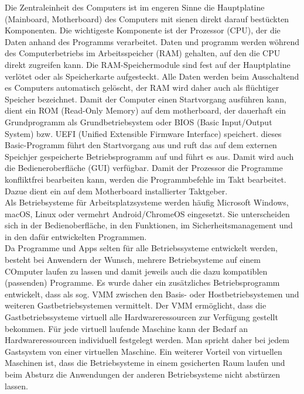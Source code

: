 \documentclass[a4paper, 12pt]{report}
\begin{document}
\begin{multicols}{2}
Die Zentraleinheit des Computers ist im engeren Sinne die Hauptplatine
(Mainboard, Motherboard) des Computers mit sienen direkt darauf bestückten
Komponenten. Die wichtigeste Komponente ist der Prozessor (CPU), der die Daten
anhand des Programms verarbeitet. Daten und programm werden wöhrend des
Computerbetriebs im Arbeitsspeicher (RAM) gehalten, auf den die CPU direkt
zugreifen kann. %
Die RAM-Speichermodule sind fest auf der Hauptplatine verlötet oder als
Speicherkarte aufgesteckt. Alle Daten werden beim Ausschaltend es Computers
automatisch gelöscht, der RAM wird daher auch als flüchtiger Speicher
bezeichnet. %
Damit der Computer einen Startvorgang ausführen kann, dient ein ROM (Read-Only
Memory) auf dem motherboard, der dauerhaft ein Grundprogramm als
Grundbetriebsystem oder BIOS (Basic Input/Output System) bzw. UEFI (Unified
Extensible Firmware Interface) speichert. dieses Basic-Programm führt den
Startvorgang aus und ruft das auf dem externen Speichjer gespeicherte
Betriebsprogramm auf und führt es aus. Damit wird auch die Bedieneroberfläche
(GUI) verfügbar. Damit der Prozessor die Programme konfliktfrei bearbeiten kann,
werden die Programmbefehle im Takt bearbeitet. Dazue dient ein auf dem
Motherboard installierter Taktgeber. \\

Als Betriebsysteme für Arbeitsplatzsysteme werden häufig Microsoft Windows,
macOS, Linux oder vermehrt Android/ChromeOS eingesetzt. Sie unterscheiden sich
in der Bedienoberfläche, in den Funktionen, im Sicherheitsmanagement und in den
dafür entwickelten Programmen. \\

Da Programme und Apps selten für alle Betriebssysteme entwickelt werden, besteht
bei Anwendern der Wunsch, mehrere Betriebsysteme auf einem COmputer laufen zu
lassen und damit jeweils auch die dazu kompatiblen (passenden) Programme. Es
wurde daher ein zusätzliches Betriebsprogramm entwickelt, dass als sog. VMM
zwischen den Basis- oder Hostbetriebsystemen und weiteren Gastbetriebsystemen
vermittelt. Der VMM ermöglicht, dass die Gastbetriebssysteme virtuell alle
Hardwareressourcen zur Verfügung gestellt bekommen. Für jede virtuell laufende
Maschine kann der Bedarf an Hardwareressourcen individuell festgelegt werden.
Man spricht daher bei jedem Gastsystem von einer virtuellen Maschine. Ein
weiterer Vorteil von virtuellen Maschinen ist, dass die Betriebsysteme in einem
gesicherten Raum laufen und beim Absturz die Anwendungen der anderen
Betriebsysteme nicht abstürzen lassen.


\end{multicols}
\end{document}
